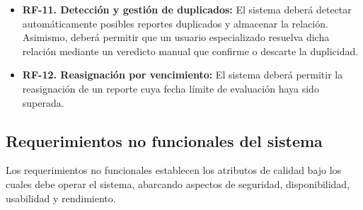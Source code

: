 \begin{itemize}
\item \textbf{RF-11. Detección y gestión de duplicados:}
El sistema deberá detectar automáticamente posibles reportes duplicados y almacenar la relación. 
Asimismo, deberá permitir que un usuario especializado resuelva dicha relación mediante un veredicto manual que confirme o descarte la duplicidad.

\item \textbf{RF-12. Reasignación por vencimiento:}
El sistema deberá permitir la reasignación de un reporte cuya fecha límite de evaluación haya sido superada. 

\end{itemize}

\subsection{Requerimientos no funcionales del sistema}
\label{subsection:requerimiento_no_funcionales}

Los requerimientos no funcionales establecen los atributos de calidad bajo los cuales debe operar el sistema, abarcando aspectos de seguridad, disponibilidad, usabilidad y rendimiento.

